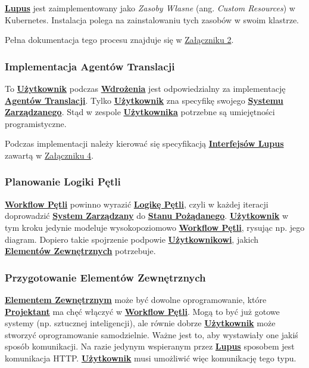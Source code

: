 \hyperlink{def:lupus}{\textbf{Lupus}} jest zaimplementowany jako \textit{Zasoby Własne} (ang. \textit{Custom Resources}) w Kubernetes. Instalacja polega na zainstalowaniu tych zasobów w swoim klastrze. 

Pełna dokumentacja tego procesu znajduje się w \hyperref[appendix:2]{Załączniku 2}.

\subsubsection{Implementacja Agentów Translacji}

To \hyperlink{def:uzytkownik}{\textbf{Użytkownik}} podczas \hyperlink{def:wdrozenie-lupus}{\textbf{Wdrożenia}} jest odpowiedzialny za implementację \hyperlink{def:agent-translacji}{\textbf{Agentów Translacji}}. Tylko \hyperlink{def:uzytkownik}{\textbf{Użytkownik}} zna specyfikę swojego \hyperlink{def:system-zarzadzany}{\textbf{Systemu Zarządzanego}}. Stąd w zespole \hyperlink{def:uzytkownik}{\textbf{Użytkownika}} potrzebne są umiejętności programistyczne. 

Podczas implementacji należy kierować się specyfikacją \hyperlink{def:interfejsy-lupus}{\textbf{Interfejsów Lupus}} zawartą w \hyperref[appendix:4]{Załączniku 4}.

\subsubsection{Planowanie Logiki Pętli}

\hyperlink{def:workflow-petli}{\textbf{Workflow Pętli}} powinno wyrazić \hyperlink{def:logika-petli}{\textbf{Logikę Pętli}}, czyli w każdej iteracji doprowadzić \hyperlink{def:system-zarzadzany}{\textbf{System Zarządzany}} do \hyperlink{def:stan-pozadany}{\textbf{Stanu Pożądanego}}. \hyperlink{def:uzytkownik}{\textbf{Użytkownik}} w tym kroku jedynie modeluje wysokopoziomowo \hyperlink{def:workflow-petli}{\textbf{Workflow Pętli}}, rysując np. jego diagram. Dopiero takie spojrzenie podpowie \hyperlink{def:uzytkownik}{\textbf{Użytkownikowi}}, jakich \hyperlink{def:element-zewnetrzny}{\textbf{Elementów Zewnętrznych}} potrzebuje.

\subsubsection{Przygotowanie Elementów Zewnętrznych}

\hyperlink{def:element-zewnetrzny}{\textbf{Elementem Zewnętrznym}} może być dowolne oprogramowanie, które \hyperlink{def:projektant}{\textbf{Projektant}} ma chęć włączyć w \hyperlink{def:workflow-petli}{\textbf{Workflow Pętli}}. Mogą to być już gotowe systemy (np. sztucznej inteligencji), ale równie dobrze \hyperlink{def:uzytkownik}{\textbf{Użytkownik}} może stworzyć oprogramowanie samodzielnie. Ważne jest to, aby wystawiały one jakiś sposób komunikacji. Na razie jedynym wspieranym przez \hyperlink{def:lupus}{\textbf{Lupus}} sposobem jest komunikacja HTTP. \hyperlink{def:uzytkownik}{\textbf{Użytkownik}} musi umożliwić więc komunikację tego typu.


